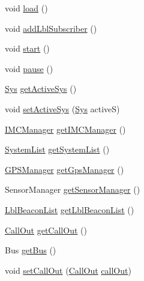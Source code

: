 \begin{DoxyCompactItemize}
\item 
void \hyperlink{classpt_1_1lsts_1_1asa_1_1ASA_a274dab64eaac88c9e34e782e4ccf0bc2}{load} ()
\item 
void \hyperlink{classpt_1_1lsts_1_1asa_1_1ASA_ae92cbe9e9151ca092c7ee6a2802bba79}{add\+Lbl\+Subscriber} ()
\item 
void \hyperlink{classpt_1_1lsts_1_1asa_1_1ASA_aa2edf96c7f2884a66e3cf9c7109c9607}{start} ()
\item 
void \hyperlink{classpt_1_1lsts_1_1asa_1_1ASA_a4500e769d8f489e76393028b64f38bcd}{pause} ()
\item 
\hyperlink{classpt_1_1lsts_1_1asa_1_1sys_1_1Sys}{Sys} \hyperlink{classpt_1_1lsts_1_1asa_1_1ASA_a558e9e6676018c9996cf7492d4cfb097}{get\+Active\+Sys} ()
\item 
void \hyperlink{classpt_1_1lsts_1_1asa_1_1ASA_aed516abf7cd5070569abea82c281f2d4}{set\+Active\+Sys} (\hyperlink{classpt_1_1lsts_1_1asa_1_1sys_1_1Sys}{Sys} active\+S)
\item 
\hyperlink{classpt_1_1lsts_1_1asa_1_1managers_1_1IMCManager}{I\+M\+C\+Manager} \hyperlink{classpt_1_1lsts_1_1asa_1_1ASA_a7516e93a72663ebf84fff6887fd6899d}{get\+I\+M\+C\+Manager} ()
\item 
\hyperlink{classpt_1_1lsts_1_1asa_1_1sys_1_1SystemList}{System\+List} \hyperlink{classpt_1_1lsts_1_1asa_1_1ASA_ab1bc552721c509ad22aef422833dd052}{get\+System\+List} ()
\item 
\hyperlink{classpt_1_1lsts_1_1asa_1_1managers_1_1GPSManager}{G\+P\+S\+Manager} \hyperlink{classpt_1_1lsts_1_1asa_1_1ASA_a326c786de016395dceae22f2b3284110}{get\+Gps\+Manager} ()
\item 
Sensor\+Manager \hyperlink{classpt_1_1lsts_1_1asa_1_1ASA_a58971b878ca91d7c571a5a512478fe6b}{get\+Sensor\+Manager} ()
\item 
\hyperlink{classpt_1_1lsts_1_1asa_1_1pos_1_1LblBeaconList}{Lbl\+Beacon\+List} \hyperlink{classpt_1_1lsts_1_1asa_1_1ASA_afdf0ace1a02f2bd19ff56fff521df6a0}{get\+Lbl\+Beacon\+List} ()
\item 
\hyperlink{classpt_1_1lsts_1_1asa_1_1feedback_1_1CallOut}{Call\+Out} \hyperlink{classpt_1_1lsts_1_1asa_1_1ASA_aac9108033c17cc70acbb95098d3b9867}{get\+Call\+Out} ()
\item 
Bus \hyperlink{classpt_1_1lsts_1_1asa_1_1ASA_ac3f1a6f82a4b3a2e34c07bf9d6b65361}{get\+Bus} ()
\item 
void \hyperlink{classpt_1_1lsts_1_1asa_1_1ASA_aeb6419187654c91d4202bb0aa3b35d20}{set\+Call\+Out} (\hyperlink{classpt_1_1lsts_1_1asa_1_1feedback_1_1CallOut}{Call\+Out} \hyperlink{classpt_1_1lsts_1_1asa_1_1ASA_aedf7af794060d789656aa41a10649684}{call\+Out})

\end{DoxyCompactItemize}
